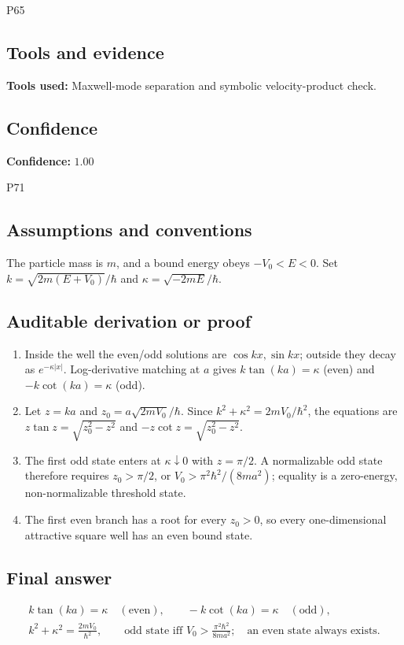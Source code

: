 \documentclass[11pt]{article}
\begin{document}
\begin{mprsolution}{P65}
\subsection*{Tools and evidence}
\textbf{Tools used:} Maxwell-mode separation and symbolic velocity-product
check.
\subsection*{Confidence}
\textbf{Confidence:} \(1.00\)
\end{mprsolution}

\begin{mprsolution}{P71}
\subsection*{Assumptions and conventions}
The particle mass is \(m\), and a bound energy obeys \(-V_0<E<0\).
Set \(k=\sqrt{2m(E+V_0)}/\hbar\) and
\(\kappa=\sqrt{-2mE}/\hbar\).
\subsection*{Auditable derivation or proof}
\begin{enumerate}[label=\textbf{Step \arabic*:},leftmargin=*]
\item Inside the well the even/odd solutions are \(\cos kx,\sin kx\);
outside they decay as \(e^{-\kappa|x|}\).  Log-derivative matching at \(a\)
gives \(k\tan(ka)=\kappa\) (even) and
\(-k\cot(ka)=\kappa\) (odd).
\item Let \(z=ka\) and
\(z_0=a\sqrt{2mV_0}/\hbar\).  Since
\(k^2+\kappa^2=2mV_0/\hbar^2\), the equations are
\(z\tan z=\sqrt{z_0^2-z^2}\) and
\(-z\cot z=\sqrt{z_0^2-z^2}\).
\item The first odd state enters at \(\kappa\downarrow0\) with
\(z=\pi/2\).  A normalizable odd state therefore requires
\(z_0>\pi/2\), or \(V_0>\pi^2\hbar^2/(8ma^2)\); equality is a
zero-energy, non-normalizable threshold state.
\item The first even branch has a root for every \(z_0>0\), so every
one-dimensional attractive square well has an even bound state.
\end{enumerate}
\subsection*{Final answer}
\[
\boxed{\begin{gathered}
k\tan(ka)=\kappa\quad(\mathrm{even}),\qquad
-k\cot(ka)=\kappa\quad(\mathrm{odd}),\\
k^2+\kappa^2=\frac{2mV_0}{\hbar^2},\qquad
\text{odd state iff }V_0>\frac{\pi^2\hbar^2}{8ma^2};
\quad\text{an even state always exists.}
\end{gathered}}
\]

\end{mprsolution}
\end{document}
